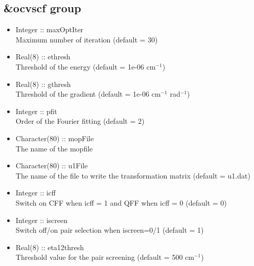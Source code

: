 \documentclass[a4paper,12pt]{article}
\begin{document}
\subsection{\&ocvscf group}
   \begin{itemize}
     \item Integer :: maxOptIter \\
       Maximum number of iteration (default = 30)
     \item Real(8) :: ethresh \\
       Threshold of the energy (default = 1e-06 cm$^{-1}$)
     \item Real(8) :: gthresh \\
       Threshold of the gradient (default = 1e-06 cm$^{-1}$ rad$^{-1}$)
     \item Integer :: pfit \\
       Order of the Fourier fitting (default = 2)
     \item Character(80) :: mopFile \\
       The name of the mopfile
     \item Character(80) :: u1File \\
       The name of the file to write the transformation matrix (default = u1.dat)
     \item Integer :: icff \\
       Switch on CFF when icff = 1 and QFF when icff = 0 (default = 0)
     \item Integer :: iscreen \\
       Switch off/on pair selection when iscreen=0/1 (default = 1)
     \item Real(8) :: eta12thresh \\
       Threshold value for the pair screening  (default = 500 cm$^{-1}$)
   \end{itemize}
\end{document}
